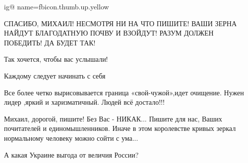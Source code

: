 \begin{itemize}
\ifcmt
  ig@ name=fbicon.thumb.up.yellow
\fi

\par
 

СПАСИБО, МИХАИЛ! НЕСМОТРЯ НИ НА ЧТО ПИШИТЕ! ВАШИ ЗЕРНА НАЙДУТ БЛАГОДАТНУЮ ПОЧВУ
И ВЗОЙДУТ! РАЗУМ ДОЛЖЕН ПОБЕДИТЬ! ДА БУДЕТ ТАК!


 
Так хочется, чтобы вас услышали!

 
Каждому следует начинать с себя

 
Все более четко вырисовывается граница «свой-чужой»,идет очищение. Нужен лидер
,яркий и харизматичный. Людей всё достало!!!

 

Михаил, дорогой, пишите! Без Вас - НИКАК... Пишите для нас, Ваших почитателей и
единомышленников. Иначе в этом королевстве кривых зеркал нормальному человеку
можно сойти с ума...

 
А какая Украине выгода от величия России?

\end{itemize}

